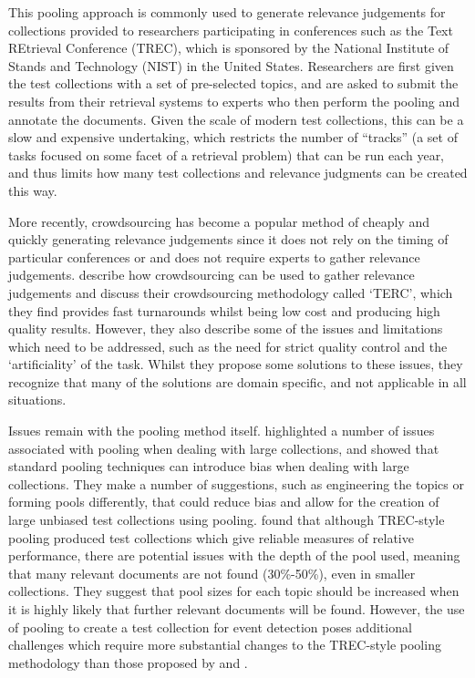 This pooling  approach is commonly used to generate relevance judgements for collections provided to researchers participating in conferences such as the Text REtrieval Conference (TREC), which is sponsored by the National Institute of Stands and Technology (NIST) in the United States.
Researchers are first given the test collections with a set of pre-selected topics, and are asked to submit the results from their retrieval systems to experts who then perform the pooling and annotate the documents.
Given the scale of modern test collections, this can be a slow and expensive undertaking, which restricts the number of ``tracks'' (a set of tasks focused on some facet of a retrieval problem) that can be run each year, and thus limits how many test collections and relevance judgments can be created this way.

More recently, crowdsourcing has become a popular method of cheaply and quickly generating relevance judgements since it does not rely on the timing of particular conferences or and does not require experts to gather relevance judgements.
\cite{Alonso:2008:CRE:1480506.1480508} describe how crowdsourcing can be used to gather relevance judgements and discuss their crowdsourcing methodology called `TERC', which they find provides fast turnarounds whilst being low cost and producing high quality results.
However, they also describe some of the issues and limitations which need to be addressed, such as the need for strict quality control and the `artificiality' of the task.
Whilst they propose some solutions to these issues, they recognize that many of the solutions are domain specific, and not applicable in all situations.

Issues remain with the pooling method itself.
\cite{Buckley:2007:BLP:1298708.1298735} highlighted a number of issues associated with pooling when dealing with large collections, and showed that standard pooling techniques can introduce bias when dealing with large collections.
They make a number of suggestions, such as engineering the topics or forming pools differently, that could reduce bias and allow for the creation of large unbiased test collections using pooling.
\cite{Zobel:1998:RRL:290941.291014} found that although TREC-style pooling produced test collections which give reliable measures of relative performance, there are potential issues with the depth of the pool used, meaning that many relevant documents are not found (30\%-50\%), even in smaller collections.
They suggest that pool sizes for each topic should be increased when it is highly likely that further relevant documents will be found.
However, the use of pooling to create a test collection for event detection poses additional challenges which require more substantial changes to the TREC-style pooling methodology than those proposed by \cite{Buckley:2007:BLP:1298708.1298735} and \cite{Zobel:1998:RRL:290941.291014}.

